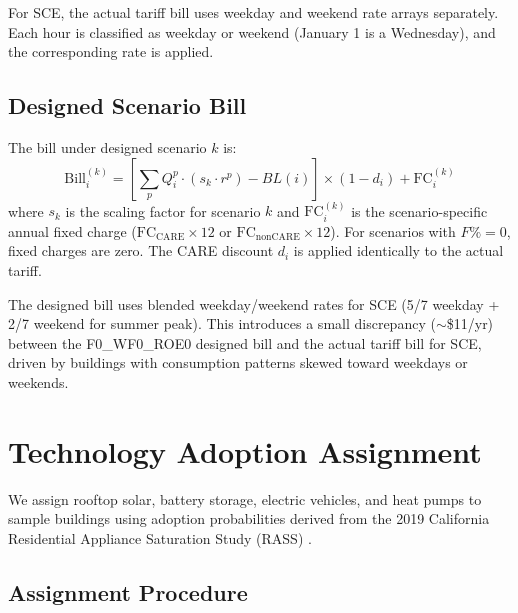 \documentclass[11pt]{article}
\begin{document}
For SCE, the actual tariff bill uses weekday and weekend rate arrays separately. Each hour is classified as weekday or weekend (January 1 is a Wednesday), and the corresponding rate is applied.

\subsection{Designed Scenario Bill}

The bill under designed scenario $k$ is:
\begin{equation}
\text{Bill}_i^{(k)} = \left[\sum_p Q_i^p \cdot (s_k \cdot r^p) - BL(i)\right] \times (1 - d_i) + \text{FC}_i^{(k)}
\label{eq:designed_bill}
\end{equation}
where $s_k$ is the scaling factor for scenario $k$ and $\text{FC}_i^{(k)}$ is the scenario-specific annual fixed charge ($\text{FC}_{\text{CARE}} \times 12$ or $\text{FC}_{\text{nonCARE}} \times 12$). For scenarios with $F\% = 0$, fixed charges are zero. The CARE discount $d_i$ is applied identically to the actual tariff.

The designed bill uses blended weekday/weekend rates for SCE (5/7 weekday + 2/7 weekend for summer peak). This introduces a small discrepancy ($\sim$\$11/yr) between the F0\_WF0\_ROE0 designed bill and the actual tariff bill for SCE, driven by buildings with consumption patterns skewed toward weekdays or weekends.

\section{Technology Adoption Assignment}
\label{sec:tech_adoption}

We assign rooftop solar, battery storage, electric vehicles, and heat pumps to sample buildings using adoption probabilities derived from the 2019 California Residential Appliance Saturation Study (RASS) \cite{rass2019}.

\subsection{Assignment Procedure}
\end{document}
